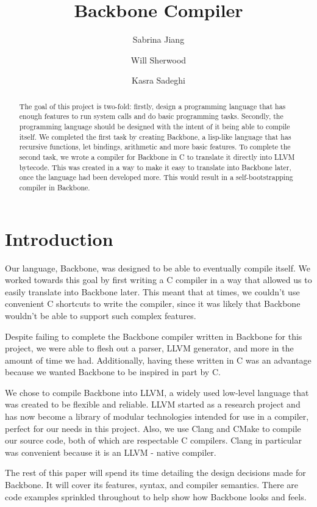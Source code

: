 \documentclass[journal=jacsat, manuscript=article]{achemso}
\author{Sabrina Jiang}
\author{Will Sherwood}
\author{Kasra Sadeghi}
\title{Backbone Compiler}
\begin{document}
\begin{abstract}

The goal of this project is two-fold: firstly, design a programming language that has enough features
to run system calls and do basic programming tasks. Secondly, the programming language should be designed with the intent of it being able to compile itself.
We completed the first task by creating Backbone, a lisp-like language that has recursive functions, let bindings, arithmetic and more basic features. 
To complete the second task, we wrote a compiler for Backbone in C to translate it directly into LLVM bytecode. This was created in a way to make it easy to translate into Backbone later, once the language had been developed more. This would result in a self-bootstrapping compiler in Backbone.

\end{abstract}

\section{Introduction}

Our language, Backbone, was designed to be able to eventually compile itself. We worked towards this goal by first writing a C compiler in a way that allowed us to easily translate into Backbone later. This meant that at times, we couldn't use convenient C shortcuts to write the compiler, since it was likely that Backbone wouldn't be able to support such complex features.

Despite failing to complete the Backbone compiler written in Backbone for this project, we were able to flesh out a parser, LLVM generator, and more in the amount of time we had. Additionally, having these written in C was an advantage because we wanted Backbone to be inspired in part by C.

We chose to compile Backbone into LLVM, a widely used low-level language that was created to be flexible and reliable. LLVM started as a research project and has now become a library of modular technologies intended for use in a compiler, perfect for our needs in this project. Also, we use Clang and CMake to compile our source code, both of which are respectable C compilers. Clang in particular was convenient because it is an LLVM - native compiler.

The rest of this paper will spend its time detailing the design decisions made for Backbone. It will cover its features, syntax, and compiler semantics. There are code examples sprinkled throughout to help show how Backbone looks and feels.
\end{document}
